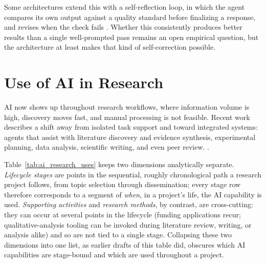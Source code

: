 \documentclass[sn-basic,Numbered]{sn-jnl}
\begin{document}
Some architectures extend this with a self-reflection loop, in which
the agent compares its own output against a quality standard before
finalizing a response, and revises when the check fails
\cite{deshmukh2025agentic}. Whether this consistently produces better
results than a single well-prompted pass remains an open empirical
question, but the architecture at least makes that kind of
self-correction possible.

\section{Use of AI in Research}
\label{sec:useofai}

AI now shows up throughout research workflows, where
information volume is high, discovery moves fast, and manual
processing is not feasible. Recent work describes a shift away from
isolated task support and toward integrated systems: agents that
assist with literature discovery and evidence
synthesis, experimental planning, data analysis, scientific writing,
and even peer review.
\cite{tie2025aiscientists,kamath2025academic,gridach2025scientific}.

Table~\ref{tab:ai_research_uses} keeps two dimensions analytically
separate. \emph{Lifecycle stages} are points in the sequential,
roughly chronological path a research project follows, from topic
selection through dissemination; every stage row therefore corresponds
to a segment of \emph{when}, in a project's life, the AI capability is
used. \emph{Supporting activities} and \emph{research methods}, by
contrast, are cross-cutting: they can occur at several points in the
lifecycle (funding applications recur; qualitative-analysis tooling can
be invoked during literature review, writing, or analysis alike) and
so are not tied to a single stage. Collapsing these two dimensions into
one list, as earlier drafts of this table did, obscures which AI
capabilities are stage-bound and which are used throughout a project.
\end{document}
